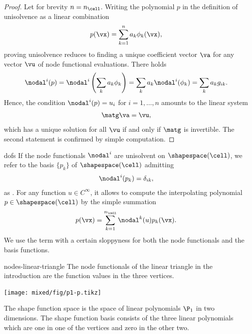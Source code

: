 \begin{proof}
  Let for brevity $n=n_{\cell}$. Writing the polynomial $p$ in the
  definition of unisolvence as a linear combination
  \begin{gather}
    p(\vx) = \sum_{k=1}^n a_k \phi_k(\vx),
  \end{gather}
  proving unisolvence reduces to finding a unique coefficient vector
  $\va$ for any vector $\vu$ of node functional evaluations. There holds
  \begin{gather}
    \nodal^i(p)
    = \nodal^i\left(\sum_k a_k\phi_k\right)
    = \sum_k a_k \nodal^i(\phi_k)
    = \sum_k a_k g_{ik}.
  \end{gather}
  Hence, the condition $\nodal^i(p) = u_i$ for $i=1,\dots,n$ amounts
  to the linear system
  \begin{gather}
    \matg\va = \vu,
  \end{gather}
  which has a unique solution for all $\vu$ if and only if $\matg$ is
  invertible. The second statement is confirmed by simple computation.
\end{proof}

\begin{Notation}{dofs}
  If the node functionals $\nodal^i$ are unisolvent on
  $\shapespace(\cell)$, we refer to the basis $\{p_k\}$ of
  $\shapespace(\cell)$ admitting
  \begin{gather}
    \nodal^i(p_k) = \delta_{ik},
  \end{gather}
  as . For any function $u\in C^\infty$,
  it allows to compute the interpolating polynomial
  $p \in \shapespace(\cell)$ by the simple summation
  \begin{gather}
    p(\vx) = \sum_{k=1}^{n_\cell} \nodal^k(u) p_k(\vx).
  \end{gather}
  We use the term  with a certain
  sloppyness for both the node functionals and the basis functions.
\end{Notation}

\begin{Example}{nodes-linear-triangle}
  The node functionals of the linear triangle in the introduction are the function values in the three vertices.
  \begin{center}
    \texttt{[image: mixed/fig/p1-p.tikz]}    
  \end{center}
  The shape function space is the space of linear polynomials $\P_1$
  in two dimensions. The shape function basis consists of the three
  linear polynomials which are one in one of the vertices and zero in
  the other two.
\end{Example}

